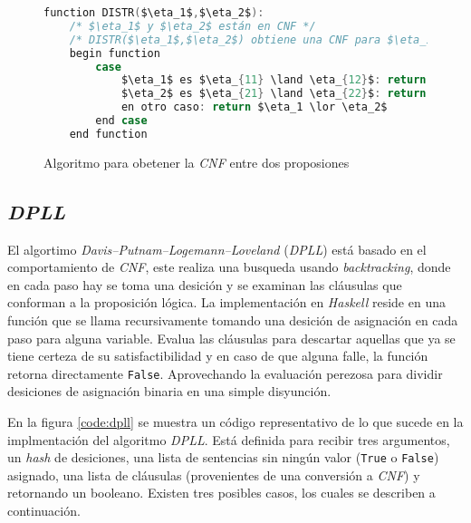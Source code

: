 \begin{figure}
\begin{lstlisting}[language=C,mathescape=true,keywordstyle=\color{black}]
    function DISTR($\eta_1$,$\eta_2$):
    /* $\eta_1$ y $\eta_2$ están en CNF */
    /* DISTR($\eta_1$,$\eta_2$) obtiene una CNF para $\eta_1 \lor \eta_2$ */
    begin function
        case
            $\eta_1$ es $\eta_{11} \land \eta_{12}$: return DISTR($\eta_{11}$,$\eta_{2}$) $\land$ DISTR($\eta_{12}$,$\eta_{2}$)
            $\eta_2$ es $\eta_{21} \land \eta_{22}$: return DISTR($\eta_1$,$\eta_{21}$) $\land$ DISTR($\eta_1$,$\eta_{22}$)
            en otro caso: return $\eta_1 \lor \eta_2$
        end case
    end function
\end{lstlisting}
\caption{Algoritmo para obetener la \textit{CNF} entre dos proposiones}
\label{code:distr}
\end{figure}

\subsection{\textit{DPLL}}

El algortimo \textit{Davis–Putnam–Logemann–Loveland} (\textit{DPLL})\cite{Davis} está basado en el comportamiento de \textit{CNF}, este realiza una busqueda usando \textit{backtracking}, donde en cada paso hay se toma una desición y se examinan las cláusulas que conforman a la proposición lógica. La implementación en \textit{Haskell} reside en una función que se llama recursivamente tomando una desición de asignación en cada paso para alguna variable. Evalua las cláusulas para descartar aquellas que ya se tiene certeza de su satisfactibilidad y en caso de que alguna falle, la función retorna directamente \texttt{False}. Aprovechando la evaluación perezosa para dividir desiciones de asignación binaria en una simple disyunción.

En la figura \ref{code:dpll} se muestra un código representativo de lo que sucede en la implmentación del algoritmo \textit{DPLL}. Está definida para recibir tres argumentos, un \textit{hash} de desiciones, una lista de sentencias sin ningún valor (\texttt{True} o \texttt{False}) asignado, una lista de cláusulas (provenientes de una conversión a \textit{CNF}) y retornando un booleano. Existen tres posibles casos, los cuales se describen a continuación.

